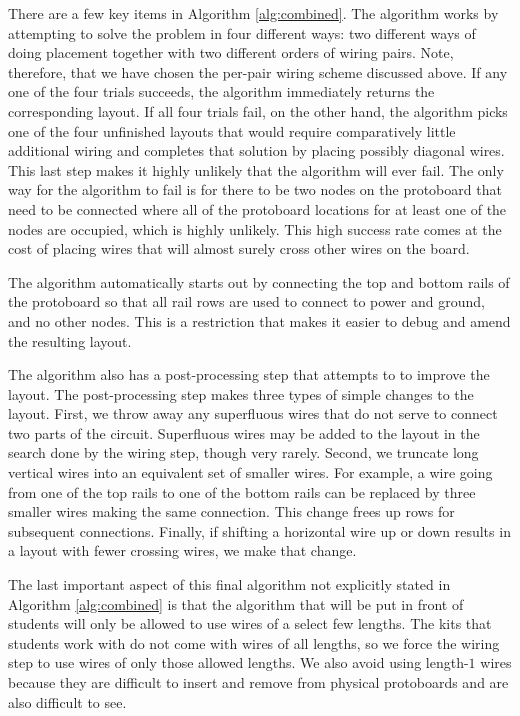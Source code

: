 There are a few key items in Algorithm \ref{alg:combined}. The algorithm works
by attempting to solve the problem in four different ways: two different ways of
doing placement together with two different orders of wiring pairs. Note,
therefore, that we have chosen the per-pair wiring scheme discussed above.
If any one of the four trials
succeeds, the algorithm immediately returns the corresponding layout. If all
four trials fail, on the other hand, the algorithm picks one of the four
unfinished layouts that would require comparatively little additional wiring and
completes that solution by placing possibly diagonal wires. This last step makes
it highly unlikely that the algorithm will ever fail.
The only way for the algorithm to fail is for there to be two nodes on the
protoboard that need to be
connected where all of the protoboard locations for at least one of the nodes are
occupied, which is highly unlikely. This high success rate comes at the
cost of placing wires that will almost surely cross other wires on the board.

The algorithm automatically starts out by connecting the top and bottom rails
of the protoboard
so that all rail rows are used to connect to power and ground, and no other
nodes. This is a restriction that makes it easier to debug and amend the
resulting layout.

The algorithm also has a post-processing step that attempts to to improve the
layout. The post-processing step makes three types of simple changes to the
layout. First, we throw away any superfluous wires that do not serve to connect
two parts of the circuit. Superfluous wires may be added to the layout
in the search done by the wiring step, though very rarely. Second, we truncate
long vertical wires into an equivalent set of smaller wires. For example, a wire
going from one of the top rails to one of the bottom rails can be replaced by
three smaller wires making the same connection. This change frees up rows for
subsequent connections. Finally, if shifting a horizontal wire up or down
results in a layout with fewer crossing wires, we make that change.

The last important aspect of this final algorithm not explicitly stated in
Algorithm \ref{alg:combined} is that the algorithm that will be put
in front of students will only be allowed to use wires of a select few lengths.
The kits that students work with do not come with wires of all lengths,
so we force the wiring step to use wires of only those allowed lengths. We also
avoid using length-$1$ wires because they are difficult to insert and
remove from physical protoboards and are also difficult to see.

